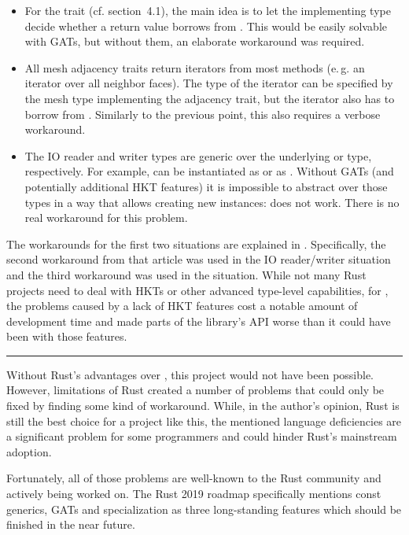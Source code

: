\begin{itemize}
  \item For the  trait (cf. section~4.1), the main idea is to let the implementing type decide whether a return value borrows from .
  This would be easily solvable with GATs, but without them, an elaborate workaround was required.
  \item All mesh adjacency traits return iterators from most methods (e.\,g. an iterator over all neighbor faces).
  The type of the iterator can be specified by the mesh type implementing the adjacency trait, but the iterator also has to borrow from .
  Similarly to the previous point, this also requires a verbose workaround.
  \item The IO reader and writer types are generic over the underlying  or  type, respectively.
  For example,  can be instantiated as  or as .
  Without GATs (and potentially additional HKT features) it is impossible to abstract over those types in a way that allows creating new instances:  does not work.
  There is no real workaround for this problem.
\end{itemize}

The workarounds for the first two situations are explained in \cite{gatworkaround}.
Specifically, the second workaround from that article was used in the IO reader/writer situation and the third workaround was used in the  situation.
While not many Rust projects need to deal with HKTs or other advanced type-level capabilities, for , the problems caused by a lack of HKT features cost a notable amount of development time and made parts of the library's API worse than it could have been with those features.

\vfill

\begin{center}
\rule{.8\textwidth}{.15mm}
\end{center}

Without Rust's advantages over \cpp, this project would not have been possible.
However, limitations of Rust created a number of problems that could only be fixed by finding some kind of workaround.
While, in the author's opinion, Rust is still the best choice for a project like this, the mentioned language deficiencies are a significant problem for some programmers and could hinder Rust's mainstream adoption.

Fortunately, all of those problems are well-known to the Rust community and actively being worked on.
The Rust 2019 roadmap \cite{rfc2657} specifically mentions const generics, GATs and specialization as three long-standing features which should be finished in the near future.

\vspace{1cm}
